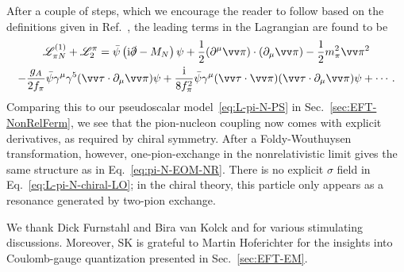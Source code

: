 After a couple of steps, which we encourage the reader to follow 
based on the definitions given in Ref.~\cite{Scherer:2012xha}, the leading 
terms in the Lagrangian are found to be
%
\begin{multline}
 \LL_{\pi N}^{(1)} + \LL_2^\pi
 = \bar{\psi}\left(\ii\slashed{\partial}-\MN\right)\psi
 + \frac{1}{2}(\partial^\mu\skvec{\pi})\cdot(\partial_\mu\skvec{\pi})
 - \frac{1}{2}\mpi^2 \skvec{\pi}^2\\
 - \frac{g_A}{2\fpi}\bar{\psi}\gamma^\mu\gamma^5
 (\skvec{\tau}\cdot\partial_\mu\skvec{\pi})\psi
 + \frac{\ii}{8\fpi^2}\bar{\psi}\gamma^\mu
 (\skvec{\tau}\cdot\skvec{\pi})(\skvec{\tau}\cdot\partial_\mu\skvec{\pi})\psi
 + \cdots \,.
\label{eq:L-pi-N-chiral-LO}
\end{multline}
%
Comparing this to our pseudoscalar model~\eqref{eq:L-pi-N-PS} in 
Sec.~\ref{sec:EFT-NonRelFerm}, we see that the pion-nucleon coupling now comes 
with explicit derivatives, as required by chiral symmetry.  After a 
Foldy-Wouthuysen transformation, however, one-pion-exchange in the 
nonrelativistic limit gives the same structure as in 
Eq.~\eqref{eq:pi-N-EOM-NR}.  There is no explicit $\sigma$ field in 
Eq.~\eqref{eq:L-pi-N-chiral-LO}; in the chiral theory, this particle only 
appears as a resonance generated by two-pion exchange.

\begin{acknowledgement}
We thank Dick Furnstahl and Bira van Kolck and for various stimulating 
discussions.  Moreover, SK is grateful to Martin Hoferichter for the insights 
into Coulomb-gauge quantization presented in Sec.~\ref{sec:EFT-EM}.
\end{acknowledgement}



